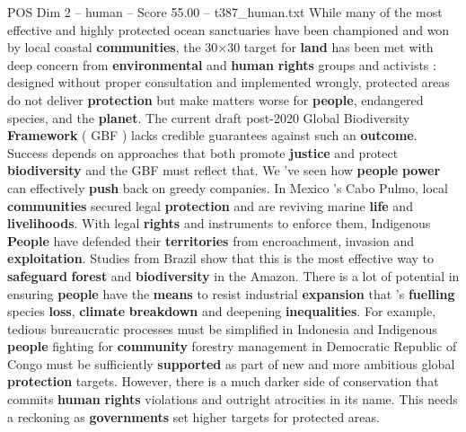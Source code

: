 \begin{textsample}{POS Dim 2 – human – Score 55.00 – t387\_human.txt}
While many of the most effective and highly protected ocean sanctuaries have been championed and won by local coastal \textbf{communities}, the 30×30 target for \textbf{land} has been met with deep concern from \textbf{environmental} and \textbf{human} \textbf{rights} groups and activists : designed without proper consultation and implemented wrongly, protected areas do not deliver \textbf{protection} but make matters worse for \textbf{people}, endangered species, and the \textbf{planet}.
The current draft post-2020 Global Biodiversity \textbf{Framework} ( GBF ) lacks credible guarantees against such an \textbf{outcome}.
Success depends on approaches that both promote \textbf{justice} and protect \textbf{biodiversity} and the GBF must reflect that.
We ’ve seen how \textbf{people} \textbf{power} can effectively \textbf{push} back on greedy companies.
In Mexico ’s Cabo Pulmo, local \textbf{communities} secured legal \textbf{protection} and are reviving marine \textbf{life} and \textbf{livelihoods}.
With legal \textbf{rights} and instruments to enforce them, Indigenous \textbf{People} have defended their \textbf{territories} from encroachment, invasion and \textbf{exploitation}.
Studies from Brazil show that this is the most effective way to \textbf{safeguard} \textbf{forest} and \textbf{biodiversity} in the Amazon.
There is a lot of potential in ensuring \textbf{people} have the \textbf{means} to resist industrial \textbf{expansion} that ’s \textbf{fuelling} species \textbf{loss}, \textbf{climate} \textbf{breakdown} and deepening \textbf{inequalities}.
For example, tedious bureaucratic processes must be simplified in Indonesia and Indigenous \textbf{people} fighting for \textbf{community} forestry management in Democratic Republic of Congo must be sufficiently \textbf{supported} as part of new and more ambitious global \textbf{protection} targets.
However, there is a much darker side of conservation that commits \textbf{human} \textbf{rights} violations and outright atrocities in its name.
This needs a reckoning as \textbf{governments} set higher targets for protected areas.

\end{textsample}
